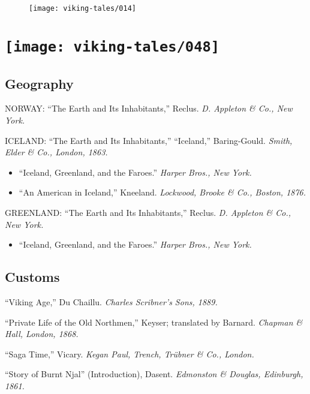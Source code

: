 \begin{figure}[hb]
    \centering
    \vskip8pt
    \texttt{[image: viking-tales/014]}
\end{figure}

\chapter[A Reading List]{
    \texttt{[image: viking-tales/048]}}

\section*{Geography}

NORWAY: ``The Earth and Its Inhabitants,'' Reclus. \emph{D. Appleton \&
Co., New York.}

\noindent ICELAND: ``The Earth and Its Inhabitants,'' ``Iceland,''
Baring-Gould. \emph{Smith, Elder \& Co., London, 1863.}

\begin{itemize}[itemsep=0pt]
\item ``Iceland, Greenland, and the Faroes.'' \emph{Harper Bros., New York.}
\item ``An American in Iceland,'' Kneeland. \emph{Lockwood, Brooke \& Co., Boston,
1876.}
\end{itemize}

\noindent GREENLAND: ``The Earth and Its Inhabitants,'' Reclus. \emph{D.
Appleton \& Co., New York.}

\begin{itemize}
\item ``Iceland, Greenland, and the Faroes.'' \emph{Harper Bros., New York.}
\end{itemize}

\section*{Customs}

``Viking Age,'' Du Chaillu. \emph{Charles Scribner's Sons, 1889.}

\noindent``Private Life of the Old Northmen,'' Keyser; translated by
Barnard. \emph{Chapman \& Hall, London, 1868.}

\noindent ``Saga Time,'' Vicary. \emph{Kegan Paul, Trench, Trübner \&
Co., London.}

\noindent ``Story of Burnt Njal'' (Introduction), Dasent. \emph{Edmonston
\& Douglas, Edinburgh, 1861.}

